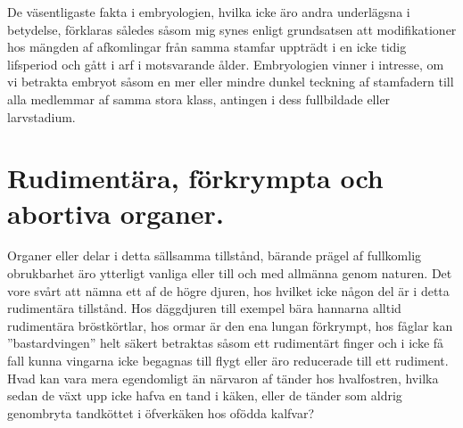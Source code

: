 De väsentligaste fakta i embryologien, hvilka icke äro andra underlägsna i betydelse, förklaras således såsom mig synes enligt grundsatsen att modifikationer hos mängden af afkomlingar från samma stamfar uppträdt i en icke tidig lifsperiod och gått i arf i motsvarande ålder. Embryologien vinner i intresse, om vi betrakta embryot såsom en mer eller mindre dunkel teckning af stamfadern till alla medlemmar af samma stora klass, antingen i dess fullbildade eller larvstadium.



\section{Rudimentära, förkrympta och abortiva organer.}

Organer eller delar i detta sällsamma tillstånd, bärande prägel af fullkomlig obrukbarhet äro ytterligt vanliga eller till och med allmänna genom naturen. Det vore svårt att nämna ett af de högre djuren, hos hvilket icke någon del är i detta rudimentära tillstånd. Hos däggdjuren till exempel bära hannarna alltid rudimentära bröstkörtlar, hos ormar är den ena lungan förkrympt, hos fåglar kan ”bastardvingen” helt säkert betraktas såsom ett rudimentärt finger och i icke få fall kunna vingarna icke begagnas till flygt eller äro reducerade till ett rudiment. Hvad kan vara mera egendomligt än närvaron af tänder hos hvalfostren, hvilka sedan de växt upp icke hafva en tand i käken, eller de tänder som aldrig genombryta tandköttet i öfverkäken hos ofödda kalfvar?

